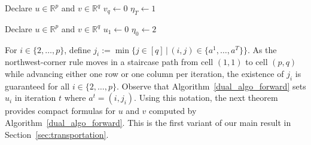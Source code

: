 \documentclass[10pt,a4paper]{amsart}
\begin{document}
\begin{algorithm}[ht]
\caption{Dual backward recursion}\label{dual_algo_backward}
\DontPrintSemicolon
Declare $u \in \mathbb{R}^p$ and $v \in \mathbb{R}^q$\;
$v_q \gets 0$\;
$\eta_T \gets 1$ 
\end{algorithm}

\begin{algorithm}[ht]
\caption{Dual forward recursion}\label{dual_algo_forward}
\DontPrintSemicolon
Declare $u \in \mathbb{R}^p$ and $v \in \mathbb{R}^q$\;
$u_1 \gets 0$\;
$\eta_0 \gets 2$ 
\end{algorithm}

For $i \in \{2, \dots, p\}$, define $j_i := \min \{j \in [q] \, | \, (i,j) \in \{a^1, \dots, a^T\}\}$. As the northwest-corner rule moves in a staircase path from cell $(1,1)$ to cell $(p,q)$ while advancing either one row or one column per iteration, the existence of $j_i$ is guaranteed for all $i \in \{2, \dots, p\}$. Observe that Algorithm~\ref{dual_algo_forward} sets $u_i$ in iteration $t$ where $a^t = (i, j_i)$. Using this notation, the next theorem provides compact formulas for $u$ and $v$ computed by Algorithm~\ref{dual_algo_forward}. This is the first variant of our main result in Section~\ref{sec:transportation}.
\end{document}
